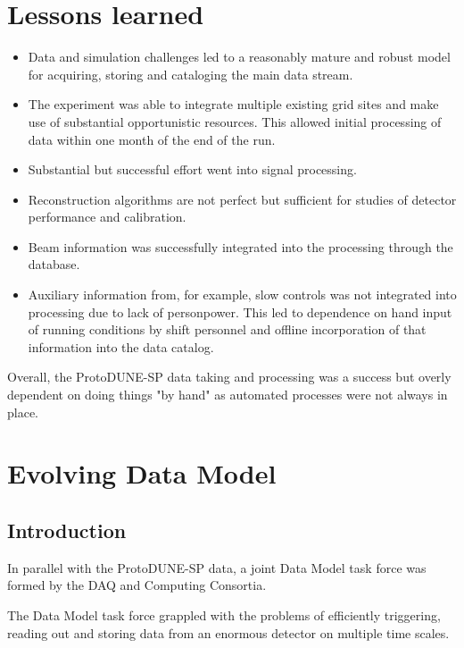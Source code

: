 \section{Lessons learned}

\begin{itemize}
    \item Data and simulation challenges led to a reasonably mature and robust model for acquiring, storing and cataloging the main data stream. 
    \item The experiment was able to integrate multiple existing grid sites and make use of substantial opportunistic resources.  This allowed initial processing of data within one month of the end of the run.
    \item Substantial but successful effort went into signal processing. 
    \item Reconstruction algorithms are not perfect but sufficient for studies of detector performance and calibration. 
    \item Beam information was successfully integrated into the processing through the  database.
    \item Auxiliary information from, for example, slow controls was not integrated into processing due to lack of personpower.  This led to dependence on hand input of running conditions by shift personnel and offline incorporation of that information into the data catalog. 
\end{itemize}

Overall, the ProtoDUNE-SP data taking and processing was a success but overly dependent on doing things "by hand" as automated processes were not always in place. 






\section{Evolving Data Model}		
\label{ch:exec-comp-mod}

\subsection{Introduction}	
\label{ch:exec-comp-mod-int}
In parallel with the ProtoDUNE-SP data, a joint Data Model task force was formed by the DAQ and Computing Consortia. 

The Data Model task force grappled with the problems of efficiently triggering, reading out and storing data from an enormous detector on multiple time scales.


